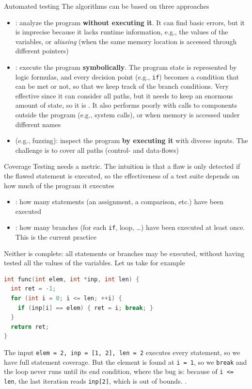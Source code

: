 \begin{parag}{Automated testing}
    The algorithms can be based on three approaches
    \begin{itemize}
        \item {}: analyze the program \textbf{without executing it}. It can find basic errors, but it is imprecise because it lacks runtime information, e.g., the values of the variables, or \textit{aliasing} (when the same memory location is accessed through different pointers)
        \item {}: execute the program \textbf{symbolically}. The program state is represented by logic formulas, and every decision point (e.g., \texttt{if}) becomes a condition that can be met or not, so that we keep track of the branch conditions. Very effective since it can consider all paths, but it needs to keep an enormous amount of state, so it is . It also performs poorly with calls to components outside the program (e.g., system calls), or when memory is accessed under different names
        \item {} (e.g., fuzzing): inspect the program \textbf{by executing it} with diverse inputs. The challenge is to cover all paths (control- and data-flows)
    \end{itemize}
\end{parag}

\begin{parag}{Coverage}
    Testing needs a metric. The intuition is that a flaw is only detected if the flawed statement is executed, so the effectiveness of a test suite depends on how much of the program it executes
    \begin{itemize}
        \item {}: how many statements (an assignment, a comparison, etc.) have been executed
        \item {}: how many branches (for each \texttt{if}, loop, \dots) have been executed at least once. This is the current practice
    \end{itemize}
    Neither is complete: all statements or branches may be executed, without having tested all the values of the variables. Let us take for example
    \begin{lstlisting}[language=C]
int func(int elem, int *inp, int len) {
  int ret = -1;
  for (int i = 0; i <= len; ++i) {
    if (inp[i] == elem) { ret = i; break; }
  }
  return ret;
}
    \end{lstlisting}
    The input \texttt{elem = 2, inp = [1, 2], len = 2} executes every statement, so we have full statement coverage. But the element is found at \texttt{i = 1}, so we \texttt{break} and the loop never runs until its end condition, where the bug is: because of \texttt{i <= len}, the last iteration reads \texttt{inp[2]}, which is out of bounds. .
\end{parag}


